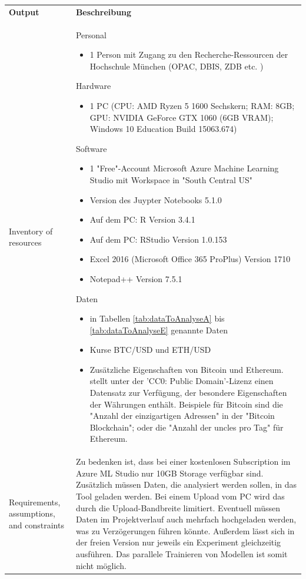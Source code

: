 \begin{centering} \footnotesize \begin{longtable}[H]{|p{3cm}|p{13cm}|}
\hline
\textbf{Output} & \textbf{Beschreibung} \\ 
\hhline{==}
Inventory of resources & Personal
\begin{itemize}
\item 1 Person mit Zugang zu den Recherche-Ressourcen der Hochschule München (OPAC, DBIS, ZDB etc. \citep{hochschulemunchen_hochschule_2017})
\end{itemize}
Hardware
\begin{itemize}
\item 1 PC (CPU: AMD Ryzen 5 1600 Sechskern; RAM: 8GB; GPU: NVIDIA GeForce GTX 1060 (6GB VRAM); Windows 10 Education Build 15063.674)
\end{itemize}
Software
\begin{itemize}
\item 1 "Free"-Account Microsoft Azure Machine Learning Studio mit Workspace in "South Central US"
\item Version des Juypter Notebooks 5.1.0
\item Auf dem PC: R Version 3.4.1
\item Auf dem PC: RStudio Version 1.0.153
\item Excel 2016 (Microsoft Office 365 ProPlus) Version 1710
\item Notepad++ Version 7.5.1
\end{itemize}
Daten
\begin{itemize}
\item in Tabellen \ref{tab:dataToAnalyseA} bis  \ref{tab:dataToAnalyseE} genannte Daten
\item Kurse BTC/USD und ETH/USD
\item Zusätzliche Eigenschaften von Bitcoin und Ethereum. \citep{kumar_cryptocurrency_2017} stellt unter der 'CC0: Public Domain'-Lizenz einen Datensatz zur Verfügung, der besondere Eigenschaften der Währungen enthält. Beispiele für Bitcoin sind die "Anzahl der einzigartigen Adressen" in der "Bitcoin Blockchain"; oder die "Anzahl der uncles pro Tag"\citep[eigene Übersetzung]{kumar_cryptocurrency_2017} für Ethereum.
\end{itemize}
\\
\hline
Requirements, assumptions, and constraints & Zu bedenken ist, dass bei einer kostenlosen Subscription im Azure ML Studio nur 10GB Storage verfügbar sind. Zusätzlich müssen Daten, die analysiert werden sollen, in das Tool geladen werden. Bei einem Upload vom PC wird das durch die Upload-Bandbreite limitiert. Eventuell müssen Daten im Projektverlauf auch mehrfach hochgeladen werden, was zu Verzögerungen führen könnte. Außerdem lässt sich in der freien Version nur jeweils ein Experiment gleichzeitig ausführen. Das parallele Trainieren von Modellen ist somit nicht möglich.\par 

\end{longtable}
\end{centering}
